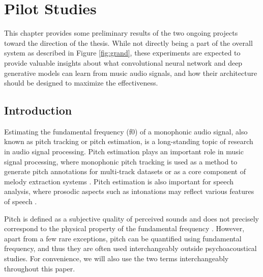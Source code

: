 
\graphicspath{{5-pilot/figures/}}
\chapter{Pilot Studies}
\label{ch:pilot}


This chapter provides some preliminary results of the two ongoing projects toward the direction of the thesis. While not directly being a part of the overall system as described in Figure \ref{fig:grand}, these experiments are expected to provide valuable insights about what convolutional neural network and deep generative models can learn from music audio signals, and how their architecture should be designed to maximize the effectiveness.


\section{Introduction}\label{sec:introduction}

Estimating the fundamental frequency (f0) of a monophonic audio signal, also known as pitch tracking or pitch estimation, is a long-standing topic of research in audio signal processing.
Pitch estimation plays an important role in music signal processing, where monophonic pitch tracking is used as a method to generate pitch annotations for multi-track datasets \cite{bittner2014medleydb} or as a core component of melody extraction systems \cite{bosch2014melody, mauch2015computer}. 
Pitch estimation is also important for speech analysis, where prosodic aspects such as intonations may reflect various features of speech \cite{zubizarreta1998prosody}.

Pitch is defined as a subjective quality of perceived sounds and does not precisely correspond to the physical property of the fundamental frequency \cite{hartmann1997signals}.
However, apart from a few rare exceptions, pitch can be quantified using fundamental frequency, and thus they are often used interchangeably outside psychoacoustical studies. 
For convenience, we will also use the two terms interchangeably throughout this paper.

